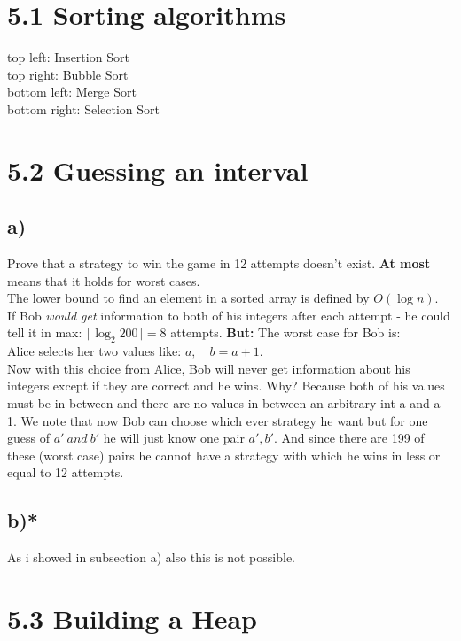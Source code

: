 \documentclass[12pt,letterpaper]{article}
\newcommand\hwnumber{5}                  %
\begin{document}
\section{\hwnumber.1 Sorting algorithms}
top left: Insertion Sort\\
top right: Bubble Sort\\
bottom left: Merge Sort \\
bottom right: Selection Sort\\

\section{\hwnumber.2 Guessing an interval}

\subsection{a)}
Prove that a strategy to win the game in 12 attempts doesn't exist.\bigbreak
\textbf{At most} means that it holds for worst cases.\\
The lower bound to find an element in a sorted array is defined by $O(\log{n})$.\\
If Bob \textit{would get} information to both of his integers after each attempt - he could tell it in max: $\lceil \log_{2}{200} \rceil = 8$ attempts.\bigbreak
\textbf{But: }The worst case for Bob is:\\
Alice selects her two values like: $a,\quad b = a+ 1$.\\
Now with this choice from Alice, Bob will never get information about his integers except if they are correct and he wins. Why? Because both of his values must be in between and there are no values in between an arbitrary int a and a + 1.\bigbreak
We note that now Bob can choose which ever strategy he want but for one guess of $a' \ and \ b'$ he will just know one pair $a', b'$. And since there are 199 of these (worst case) pairs he cannot have a strategy with which he wins in less or equal to 12 attempts.

\subsection{b)*}
As i showed in subsection a) also this is not possible.

\newpage
\section{5.3 Building a Heap}
\end{document}
